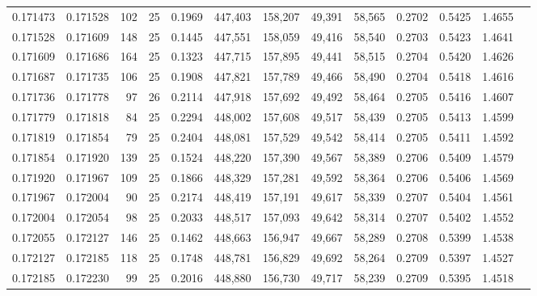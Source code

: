 \begin{tabular}{rrrrrrrrrrrrr}
0.171473 & 0.171528 &   102 &  25 &                                     0.1969 & 447,403 & 158,207 &  49,391 &  58,565 & 0.2702 & 0.5425 & 1.4655 \\
0.171528 & 0.171609 &   148 &  25 &                                     0.1445 & 447,551 & 158,059 &  49,416 &  58,540 & 0.2703 & 0.5423 & 1.4641 \\
0.171609 & 0.171686 &   164 &  25 &                                     0.1323 & 447,715 & 157,895 &  49,441 &  58,515 & 0.2704 & 0.5420 & 1.4626 \\
0.171687 & 0.171735 &   106 &  25 &                                     0.1908 & 447,821 & 157,789 &  49,466 &  58,490 & 0.2704 & 0.5418 & 1.4616 \\
0.171736 & 0.171778 &    97 &  26 &                                     0.2114 & 447,918 & 157,692 &  49,492 &  58,464 & 0.2705 & 0.5416 & 1.4607 \\
0.171779 & 0.171818 &    84 &  25 &                                     0.2294 & 448,002 & 157,608 &  49,517 &  58,439 & 0.2705 & 0.5413 & 1.4599 \\
0.171819 & 0.171854 &    79 &  25 &                                     0.2404 & 448,081 & 157,529 &  49,542 &  58,414 & 0.2705 & 0.5411 & 1.4592 \\
0.171854 & 0.171920 &   139 &  25 &                                     0.1524 & 448,220 & 157,390 &  49,567 &  58,389 & 0.2706 & 0.5409 & 1.4579 \\
0.171920 & 0.171967 &   109 &  25 &                                     0.1866 & 448,329 & 157,281 &  49,592 &  58,364 & 0.2706 & 0.5406 & 1.4569 \\
0.171967 & 0.172004 &    90 &  25 &                                     0.2174 & 448,419 & 157,191 &  49,617 &  58,339 & 0.2707 & 0.5404 & 1.4561 \\
0.172004 & 0.172054 &    98 &  25 &                                     0.2033 & 448,517 & 157,093 &  49,642 &  58,314 & 0.2707 & 0.5402 & 1.4552 \\
0.172055 & 0.172127 &   146 &  25 &                                     0.1462 & 448,663 & 156,947 &  49,667 &  58,289 & 0.2708 & 0.5399 & 1.4538 \\
0.172127 & 0.172185 &   118 &  25 &                                     0.1748 & 448,781 & 156,829 &  49,692 &  58,264 & 0.2709 & 0.5397 & 1.4527 \\
0.172185 & 0.172230 &    99 &  25 &                                     0.2016 & 448,880 & 156,730 &  49,717 &  58,239 & 0.2709 & 0.5395 & 1.4518 \\

\end{tabular}
